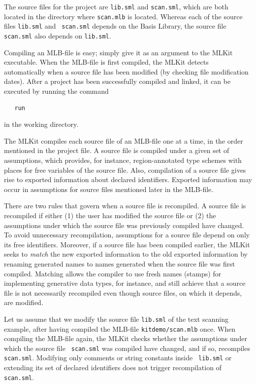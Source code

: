 \documentclass[12pt]{book}
\begin{document}
\noindent 
The source files for the project are {\tt lib.sml} and {\tt scan.sml},
which are both located in the directory where {\tt scan.mlb} is
located. Whereas each of the source files {\tt lib.sml} and {\tt
  scan.sml} depends on the Basis Library, the source file {\tt
  scan.sml} also depends on {\tt lib.sml}.


Compiling an MLB-file is easy; simply give it as an argument to the
MLKit executable. When the MLB-file is first compiled, the MLKit
detects automatically when a source file has been modified (by
checking file modification dates). After a project has been
successfully compiled and linked, it can be executed by running the
command
%
\begin{verbatim}
   run
\end{verbatim}
in the working directory.  

The MLKit compiles each source file of an MLB-file one at a time, in the
order mentioned in the project file. A source file is compiled under
a given set of assumptions, which provides, for instance, region-annotated type
schemes with places for free variables of the source file. Also, compilation of a
source file gives rise to exported information about declared
identifiers. Exported information may occur in assumptions for source
files mentioned later in the MLB-file.

There are two rules that govern when a source file is recompiled.  A
source file is recompiled if either (1) the user has modified the
source file or (2) the assumptions under which the source file was
previously compiled have changed. To avoid unnecessary recompilation,
assumptions for a source file depend on only its free identifiers.
Moreover, if a source file has been compiled earlier, the MLKit seeks to
%
{\em match\/} the new exported information to the old exported
information by renaming generated names to names generated when the
source file was first compiled. Matching allows the compiler to use
fresh names (stamps) for implementing generative data types, for
instance, and still achieve that a source file is not necessarily
%
recompiled even though source files, on which it depends, are
modified.

Let us assume that we modify the source file {\tt lib.sml} of the text
scanning example, after having compiled the MLB-file
\texttt{kitdemo/scan.mlb} once. When compiling the MLB-file again, the
MLKit checks whether the assumptions under which the source file {\tt
  scan.sml} was compiled have changed, and if so, recompiles {\tt
  scan.sml}.  Modifying only comments or string constants inside {\tt
  lib.sml} or extending its set of declared identifiers does not
trigger recompilation of {\tt scan.sml}.
\end{document}

